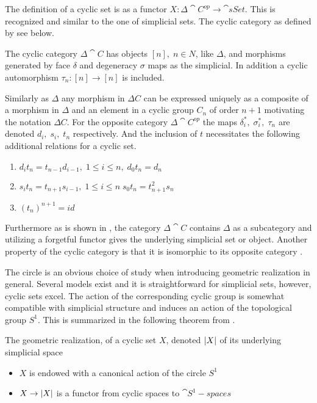 \documentclass[../../main.tex]{subfiles}
\begin{document}
    The definition of a cyclic set is as a functor $X:\Delta \cat{C^{op}} \to \cat{sSet}$. This is recognized and similar to the one of simplicial sets. The cyclic category as defined by \cite{loday-cyclic} see below.
    
    \begin{definition}
        The cyclic category $\Delta \cat{C}$ has objects $[n], \;n\in N$, like $\Delta$, and morphisms generated by face $\delta$ and degeneracy $\sigma$ maps as the simplicial. In addition a cyclic automorphism $\tau_n:[n]\to [n]$ is included.
    \end{definition}

    Similarly as $\Delta$ any morphism in $\Delta C$ can be expressed uniquely as a composite of a morphism in $\Delta$ and an element in a cyclic group $C_n$ of order $n+1$ motivating the notation $\Delta C$. For the opposite category $\Delta \cat{C^{op}}$ the maps $\delta_i^*, \; \sigma_i^*,\;\tau_n$ are denoted $d_i,\; s_i, \; t_n$ respectively. And the inclusion of $t$ necessitates the following additional relations for a cyclic set.
    \begin{enumerate}
        \item $d_it _n = t_{n-1}d_{i-1},\; 1 \leq i\leq n, \; d_0t_n=d_n$
        \item $s_i t _n = t_{n+1}s_{i-1},\; 1 \leq i\leq n \; s_0t_n=t_{n+1}^2s_n$
        \item $(t_{n})^{n+1}=id$
    \end{enumerate}
    Furthermore as is shown in \cite{loday-cyclic}, the category $\Delta \cat{C}$ contains $\Delta$ as a subcategory and utilizing a forgetful functor gives the underlying simplicial set or object. Another property of the cyclic category is that it is isomorphic to its opposite category \cite{loday-cyclic}.

    The circle is an obvious choice of study when introducing geometric realization in general. Several models exist and it is straightforward for simplicial sets, however, cyclic sets excel. The action of the corresponding cyclic group is somewhat compatible with simplicial structure and induces an action of the topological group $S^1$. This is summarized in the following theorem from \cite{loday-cyclic}.

    \begin{theorem}\label{hardstuff}
        The geometric realization, of a cyclic set $X$, denoted $\geom[X]$ of its underlying simplicial space
        \begin{itemize}
            \item $X$ is endowed with a canonical action of the circle $S^1$
            \item $X \to \geom[X]$ is a functor from cyclic spaces to $\cat{S^1-spaces}$
        \end{itemize}
    \end{theorem} %
\end{document}
